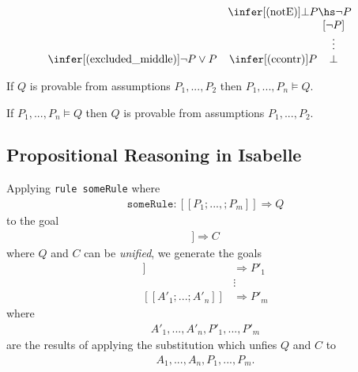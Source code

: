 \documentclass{article}
\begin{document}
\begin{definition}
\begin{align*}
\begin{array}{c c c}
{\begin{array}[b]{c}
            \end{array}} &
            \infer[(\text{notE})]{\bot}{P\hs\neg P} & \\
            \infer[(\text{excluded\_middle})]{\neg P \vee P}{} &
            \infer[\text{(ccontr)}]{P}{\begin{array}[b]{c}
                [\neg P] \\ \vdots \\ \bot
            \end{array}}
        \end{array}
    \end{align*}
\end{definition}

\begin{theorem}[Soundness]
    If $Q$ is provable from assumptions $P_1,...,P_2$ then $P_1,...,P_n\vDash Q$. 
\end{theorem}
\begin{theorem}[Completeness]
    If $P_1,...,P_n\vDash Q$ then $Q$ is provable from assumptions $P_1,...,P_2$. 
\end{theorem}

\subsection{Propositional Reasoning in Isabelle}

\newcommand{\db}[1]{[\![#1]\!]}

\begin{definition}
    Applying \texttt{rule someRule} where
    \begin{align*}
        \texttt{someRule} : \db{P_1;...,;P_m} \Rightarrow Q
    \end{align*}
    to the goal
    \begin{align*}
        \db{A_1; ...; A_n} \Rightarrow C
    \end{align*}
    where $Q$ and $C$ can be \emph{unified}, we generate the goals
    \begin{align*}
        \db{A'_1; ...; A'_n} &\Rightarrow P'_1\\
        &\vdots \\
        \db{A'_1; ...; A'_n} &\Rightarrow P'_m
    \end{align*}
    where \begin{align*}
        A'_1, ..., A'_n,P'_1,...,P'_m
    \end{align*}
    are the results of applying the
    substitution which unfies $Q$ and $C$ to
    \begin{align*}
        A_1,...,A_n,P_1,...,P_m.
    \end{align*}
\end{definition}
\end{document}
